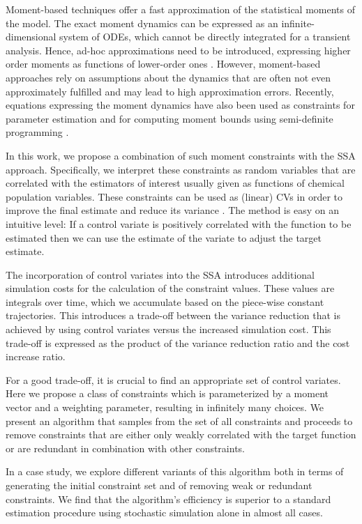 Moment-based techniques offer a fast approximation of the statistical moments of the model. 
The exact moment dynamics can be expressed as an infinite-dimensional system of \acp{ODE}, which cannot be directly  integrated for a transient analysis.
Hence, ad-hoc approximations need to be introduced, expressing higher order moments as functions of lower-order ones \cite{ale2013general,engblom2006computing}.
However, moment-based approaches rely on assumptions about the dynamics that are
often not even approximately fulfilled and may lead to high approximation errors. 
Recently, equations expressing the moment dynamics have also been used as constraints for parameter
estimation \cite{backenkohler2018moment} and for computing moment bounds using semi-definite programming \cite{dowdy2018dynamic,ghusinga2017exact}.

In this work, we propose a combination of such moment constraints with the \ac{SSA} approach.
Specifically, we   interpret these constraints as random variables 
that are correlated with the estimators of interest usually given as functions of chemical population variables.
These constraints can be used  as  (linear) \acfp{CV} in order to improve the final estimate and reduce its variance \cite{lavenberg1982statistical,szechtman2003control}.
The method is easy on an intuitive level: If a control variate
is positively correlated with the function to be estimated then 
we can use the estimate of the variate to
adjust the target estimate.

The incorporation of control variates into the \ac{SSA}
introduces   additional simulation costs for the calculation of the constraint values.
These values are integrals over time, which we accumulate  based on the
piece-wise constant trajectories.
This introduces a trade-off between the variance reduction that is achieved
by using control variates versus the increased simulation cost.
This trade-off is expressed as the product of the variance reduction ratio
and the cost increase ratio.

For a good trade-off, it is crucial to find an appropriate set of control variates.
Here we propose a class of constraints which is parameterized by a moment vector
and a weighting parameter, resulting in infinitely many choices.
We present an algorithm that samples from the set of all constraints and
proceeds to remove constraints that are either only weakly correlated with the
target function or are redundant in combination with other constraints.

In a case study, we explore different variants of this algorithm
both in terms of generating the initial constraint set and of
removing  weak or redundant constraints.
We find that the algorithm's efficiency is superior to a standard estimation procedure
using stochastic simulation alone
in almost all cases.

